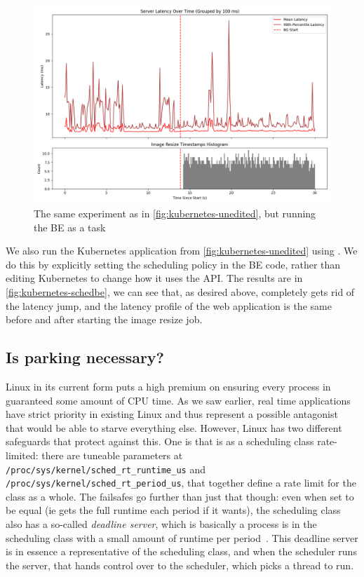 \begin{figure}[t]
    \centering
    \includegraphics[width=\columnwidth]{graphs/kubernetes-schedbe.png}
    \caption{The same experiment as in \autoref{fig:kubernetes-unedited}, but
    running the BE as a \schedbe{} task}\label{fig:kubernetes-schedbe}
\end{figure}

We also run the Kubernetes application from \autoref{fig:kubernetes-unedited}
using \schedbe{}. We do this by explicitly setting the scheduling policy in the
BE code, rather than editing Kubernetes to change how it uses the \cgroups{}
API. The results are in \autoref{fig:kubernetes-schedbe}, we can see that, as
desired above, \schedbe{} completely gets rid of the latency jump, and the
latency profile of the web application is the same before and after starting the
image resize job.


\subsection{Is parking necessary?}

Linux in its current form puts a high premium on ensuring every process in
guaranteed some amount of CPU time. As we saw earlier, real time applications
have strict priority in existing Linux and thus represent a possible antagonist
that would be able to starve everything else. However, Linux has two different
safeguards that protect against this. One is that \fifoclass{} is as a
scheduling class rate-limited: there are tuneable parameters at
\texttt{/proc/sys/kernel/sched\_rt\_runtime\_us} and
\texttt{/proc/sys/kernel/sched\_rt\_period\_us}, that together define a rate
limit for the \fifoclass{} class as a whole. The failsafes go further than just
that though: even when set to be equal (ie \fifoclass{} gets the full runtime
each period if it wants), the \normalclass{} scheduling class also has a
so-called \textit{deadline server}, which is basically a process is in the
\deadlineclass{} scheduling class with a small amount of runtime per
period~\cite{lkml-deadline-srv}. This deadline server is in essence a
representative of the \normalclass{} scheduling class, and when the
\deadlineclass{} scheduler runs the server, that hands control over to the
\normalclass{} scheduler, which picks a thread to run.


